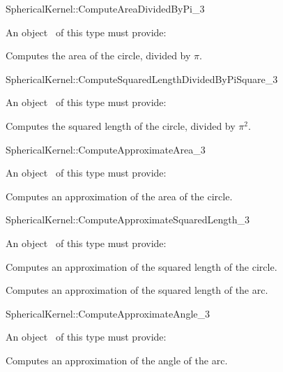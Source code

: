 \begin{ccRefFunctionObjectConcept}{SphericalKernel::ComputeAreaDividedByPi_3}

An object \ccVar\ of this type must provide:

{Computes the area of the circle, divided by $\pi$.}

\ccSeeAlso


\end{ccRefFunctionObjectConcept}
\begin{ccRefFunctionObjectConcept}{SphericalKernel::ComputeSquaredLengthDividedByPiSquare_3}

An object \ccVar\ of this type must provide:

{Computes the squared length of the circle, divided by $\pi^2$.}

\ccSeeAlso


\end{ccRefFunctionObjectConcept}
\begin{ccRefFunctionObjectConcept}{SphericalKernel::ComputeApproximateArea_3}

An object \ccVar\ of this type must provide:

{Computes an approximation of the area of the circle.}

\ccSeeAlso


\end{ccRefFunctionObjectConcept}
\begin{ccRefFunctionObjectConcept}{SphericalKernel::ComputeApproximateSquaredLength_3}

An object \ccVar\ of this type must provide:

{Computes an approximation of the squared length of the circle.}

{Computes an approximation of the squared length of the arc.}

\ccSeeAlso


\end{ccRefFunctionObjectConcept}
\begin{ccRefFunctionObjectConcept}{SphericalKernel::ComputeApproximateAngle_3}

An object \ccVar\ of this type must provide:

{Computes an approximation of the angle of the arc.}

\end{ccRefFunctionObjectConcept}
